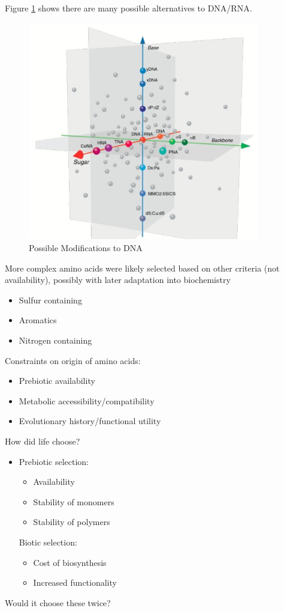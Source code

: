 \documentclass[]{article}
\begin{document}
Figure \ref{fig:PossibleModifications} shows there are many possible alternatives to DNA/RNA.
\begin{figure}[H]
	\caption{Possible Modifications to DNA} \label{fig:PossibleModifications} 
	\includegraphics[width=0.9\textwidth]{PossibleModifications}
\end{figure}

 More complex amino acids were likely selected based on other criteria (not 
availability), possibly with later adaptation into biochemistry
\begin{itemize}
	\item  Sulfur containing
	\item Aromatics
	\item Nitrogen containing
\end{itemize}
Constraints on origin of amino acids:

\begin{itemize}
	\item  Prebiotic availability
	\item  Metabolic accessibility/compatibility
	\item  Evolutionary history/functional utility
\end{itemize}

How did life choose?

\begin{itemize}
	\item Prebiotic selection:
	\begin{itemize}
		\item 	Availability
		\item Stability of monomers
		\item Stability of polymers
	\end{itemize}
	Biotic selection:
	\begin{itemize}
		\item 	Cost of biosynthesis
		\item Increased functionality
	\end{itemize}
\end{itemize}
Would it choose these twice?
\end{document}
